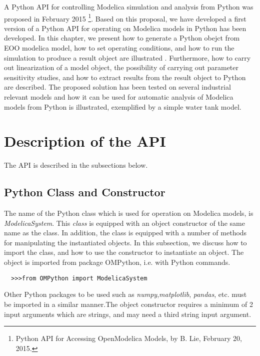 A Python API for controlling Modelica simulation and analysis from Python was proposed in February 2015 \footnote{Python API for Accessing OpenModelica Models, by B. Lie, February 20, 2015.}. Based on this proposal, we have developed a first version of a Python API for operating on Modelica models in Python has been developed. In this chapter, we present how to generate a Python obejct from EOO modelica model, how to set operating conditions, and how to run the simulation to produce a result object are illustrated . Furthermore, how to carry out linearization of a model object, the possibility of carrying out parameter sensitivity studies, and how to extract results from the result object to Python are described. The proposed solution has been tested on several industrial relevant models and how it can be used for automatic analysis of Modelica models from Python is illustrated, exemplified by a simple water tank model.

\section{Description of the API}
\label{sec:pythonapi}

The API is described in the subsections below.

\subsection{Python Class and Constructor}
\label{subsec:pythonclass}

The name of the Python class which is used for operation on Modelica models, is \textit{ModelicaSystem}.
This \textit{class} is equipped with an object constructor of the same name as the class. In addition, the class is equipped
with a number of methods for manipulating the instantiated objects. In this subsection, we discuss how to import the class, and
how to use the constructor to instantiate an object. The object is imported from package OMPython, i.e. with
Python commands.

\begin{lstlisting}
  >>>from OMPython import ModelicaSystem
\end{lstlisting}

Other Python packages to be used such as \textit{numpy},\textit{matplotlib}, \textit{pandas}, etc. must be imported in a similar
manner.The object constructor requires a minimum of 2 input arguments which are strings, and may need a third string input
argument.

